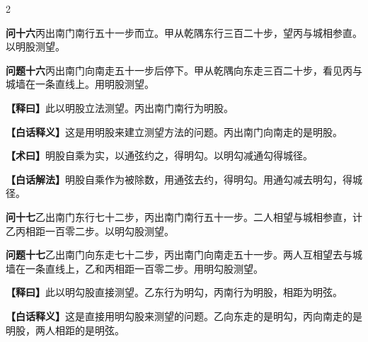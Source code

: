 \documentclass[11pt,a4paper]{article}
\newcommand{\WenQuestion}[1]{\textbf{\textcolor{classicalcolor}{#1}}}
\newcommand{\BaiQuestion}[1]{\textbf{\textcolor{moderncolor}{#1}}}
\newcommand{\WenExplain}{\textcolor{classicalcolor}{\textbf{【释曰】}}}
\newcommand{\BaiExplain}{\textcolor{moderncolor}{\textbf{【白话释义】}}}
\newcommand{\WenMethod}{\textcolor{classicalcolor}{\textbf{【术曰】}}}
\newcommand{\BaiMethod}{\textcolor{moderncolor}{\textbf{【白话解法】}}}
\begin{document}
\begin{paracol}{2}
\vspace{0.8em}

\switchcolumn*
\begin{tcolorbox}[colback=red!3,colframe=red!30!black,boxrule=0.3pt]
\WenQuestion{问十六}\quad 丙出南门南行五十一步而立。甲从乾隅东行三百二十步，望丙与城相参直。以明股测望。
\end{tcolorbox}
\switchcolumn
\begin{tcolorbox}[colback=blue!3,colframe=blue!30!black,boxrule=0.3pt]
\BaiQuestion{问题十六}\quad 丙出南门向南走五十一步后停下。甲从乾隅向东走三百二十步，看见丙与城墙在一条直线上。用明股测望。
\end{tcolorbox}

\switchcolumn*
\begin{tcolorbox}[colback=red!5,colframe=red!30!black,boxrule=0.3pt]
\WenExplain\quad 此以明股立法测望。丙出南门南行为明股。
\end{tcolorbox}
\switchcolumn
\begin{tcolorbox}[colback=blue!5,colframe=blue!30!black,boxrule=0.3pt]
\BaiExplain\quad 这是用明股来建立测望方法的问题。丙出南门向南走的是明股。
\end{tcolorbox}

\switchcolumn*
\begin{tcolorbox}[colback=red!5,colframe=red!40!black,boxrule=0.3pt]
\WenMethod\quad 明股自乘为实，以通弦约之，得明勾。以明勾减通勾得城径。
\end{tcolorbox}
\switchcolumn
\begin{tcolorbox}[colback=blue!5,colframe=blue!40!black,boxrule=0.3pt]
\BaiMethod\quad 明股自乘作为被除数，用通弦去约，得明勾。用通勾减去明勾，得城径。
\end{tcolorbox}

\vspace{0.8em}

\switchcolumn*
\begin{tcolorbox}[colback=red!3,colframe=red!30!black,boxrule=0.3pt]
\WenQuestion{问十七}\quad 乙出南门东行七十二步，丙出南门南行五十一步。二人相望与城相参直，计乙丙相距一百零二步。以明勾股测望。
\end{tcolorbox}
\switchcolumn
\begin{tcolorbox}[colback=blue!3,colframe=blue!30!black,boxrule=0.3pt]
\BaiQuestion{问题十七}\quad 乙出南门向东走七十二步，丙出南门向南走五十一步。两人互相望去与城墙在一条直线上，乙和丙相距一百零二步。用明勾股测望。
\end{tcolorbox}

\switchcolumn*
\begin{tcolorbox}[colback=red!5,colframe=red!30!black,boxrule=0.3pt]
\WenExplain\quad 此以明勾股直接测望。乙东行为明勾，丙南行为明股，相距为明弦。
\end{tcolorbox}
\switchcolumn
\begin{tcolorbox}[colback=blue!5,colframe=blue!30!black,boxrule=0.3pt]
\BaiExplain\quad 这是直接用明勾股来测望的问题。乙向东走的是明勾，丙向南走的是明股，两人相距的是明弦。
\end{tcolorbox}


\end{paracol}
\end{document}
